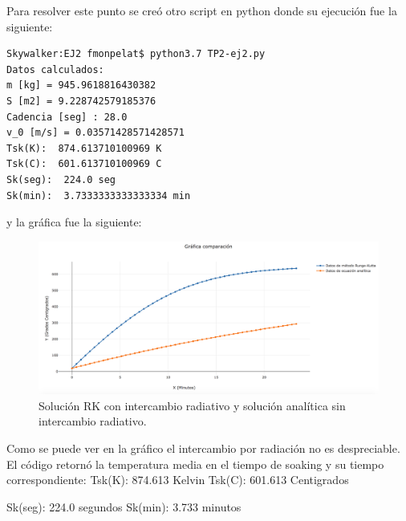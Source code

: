 \documentclass[10pt,a4paper]{article}
\begin{document}
Para resolver este punto se creó otro script en python donde su ejecución fue la siguiente:
\begin{verbatim}
Skywalker:EJ2 fmonpelat$ python3.7 TP2-ej2.py 
Datos calculados: 
m [kg] = 945.9618816430382
S [m2] = 9.228742579185376
Cadencia [seg] : 28.0
v_0 [m/s] = 0.03571428571428571
Tsk(K):  874.613710100969 K
Tsk(C):  601.613710100969 C
Sk(seg):  224.0 seg
Sk(min):  3.7333333333333334 min
\end{verbatim}
y la gráfica fue la siguiente:
\begin{figure}[H]
\centering
\includegraphics[width=18cm]{Grafica-ej2.png}
\caption{Solución RK con intercambio radiativo y solución analítica sin intercambio radiativo.}
\end{figure}
Como se puede ver en la gráfico el intercambio por radiación no es despreciable.
El código retornó la temperatura media en el tiempo de soaking y su tiempo correspondiente:
Tsk(K):  874.613 Kelvin
Tsk(C):  601.613 Centigrados

Sk(seg):  224.0 segundos
Sk(min):  3.733 minutos
\end{document}
